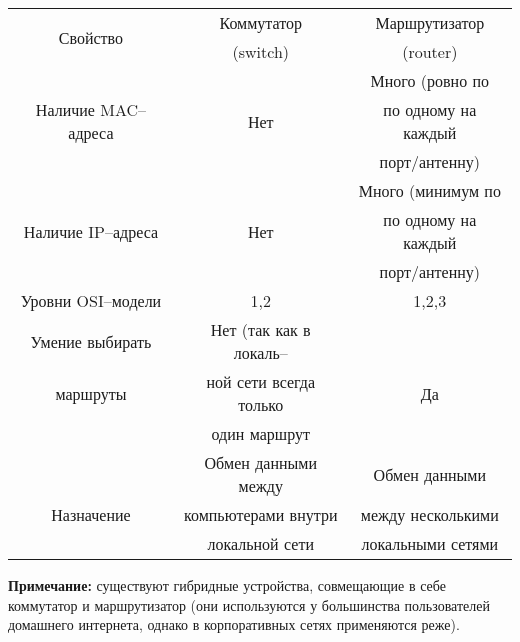 \begin{table}[!h]
 \begin{tabular}{|c|c|c|}
 \hline
 \multirow{2}{*}{Свойство} & Коммутатор & Маршрутизатор \\
 & (switch) & (router) \\
 \hline
 & & Много (ровно по \\
 Наличие MAC--адреса & Нет & по одному на каждый \\
 & & порт/антенну) \\
 \hline
 & & Много (минимум по \\
 Наличие IP--адреса & Нет & по одному на каждый \\
 & &  порт/антенну) \\
 \hline
 Уровни OSI--модели & 1,2 & 1,2,3 \\
 \hline
 Умение выбирать & Нет (так как в локаль--  & \\
 маршруты & ной сети всегда только  & Да\\
 & один маршрут & \\
 \hline
 & Обмен данными между & Обмен данными  \\
 Назначение & компьютерами внутри & между несколькими  \\
 & локальной сети & локальными сетями \\
 \hline
  \end{tabular}
\end{table}
\textbf{Примечание:} существуют гибридные устройства, совмещающие в себе коммутатор и маршрутизатор (они используются у большинства пользователей домашнего интернета, однако в корпоративных сетях применяются реже).
